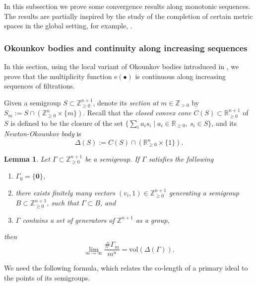 \documentclass[11pt, leqno]{amsart}%
\theoremstyle{plain}
\newtheorem{lemma}[theorem]{Lemma}
\theoremstyle{definition}
\theoremstyle{remark}
\newcommand{\bR}{\mathbb{R}}
\newcommand{\bZ}{\mathbb{Z}}
\newcommand{\vol}{\mathrm{vol}}
\newcommand{\e}{\mathrm{e}}
\numberwithin{equation}{section}
\begin{document}

In this subsection we prove some convergence results along monotonic sequences. The results are partially inspired by the study of the completion of certain metric spaces in the global setting, for example, \cites{Dar17,Xia19,BJ21}. 

\subsubsection{Okounkov bodies and continuity along increasing sequences}

In this section, using the local variant of Okounkov bodies introduced in \cites{LM09,KK14}, we prove that the multiplicity function $\e(\bullet)$ is continuous along increasing sequences of filtrations. 




Given a semigroup $S\subset\bZ^{n+1}_{\ge 0}$, denote its \emph{section at} $m\in\bZ_{>0}$ by $S_m:=S\cap (\bZ^n_{\ge 0}\times \{m\})$. Recall that the \emph{closed convex cone} $C(S)\subset \bR^{n+1}_{\ge 0}$ of $S$ is defined to be the closure of the set $\{\sum_i a_is_i\mid a_i\in\bR_{\ge 0},\ s_i\in S\}$, and its \emph{Newton-Okounkov body} is
\[
    \Delta(S):=C(S)\cap (\bR^n_{\ge 0}\times \{1\}).
\]

\begin{lemma}\cite{LM09}\label{lem:Okounkov body}
    Let $\Gamma\subset \bZ_{\ge 0}^{n+1}$ be a semigroup. If $\Gamma$ satisfies the following
    \begin{enumerate}
        \item $\Gamma_0=\{\bm{0}\}$,
		
        \item there exists finitely many vectors $(v_i,1)\in\bZ_{\ge0}^{n+1}$ generating a semigroup $B\subset \bZ_{\ge 0}^{n+1}$, such that $\Gamma\subset B$, and
		
        \item $\Gamma$ contains a set of generators of $\bZ^{n+1}$ as a group,
    \end{enumerate}
    then 
    \[
        \lim_{m\to\infty}\frac{\#\Gamma_m}{m^n}=\vol(\Delta(\Gamma)).
    \]
\end{lemma}

We need the following formula, which relates the co-length of a primary ideal to the points of its semigroups.
\end{document}
